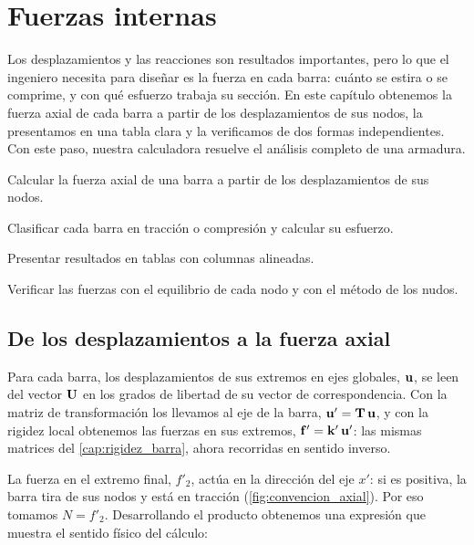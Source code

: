 \chapter{Fuerzas internas}\label{cap:fuerzas_internas}

Los desplazamientos y las reacciones son resultados importantes, pero lo que
el ingeniero necesita para diseñar es la fuerza en cada barra: cuánto se
estira o se comprime, y con qué esfuerzo trabaja su sección. En este
capítulo obtenemos la fuerza axial de cada barra a partir de los
desplazamientos de sus nodos, la presentamos en una tabla clara y la
verificamos de dos formas independientes. Con este paso, nuestra calculadora
resuelve el análisis completo de una armadura.

\begin{objetivos}
  \item Calcular la fuerza axial de una barra a partir de los
    desplazamientos de sus nodos.
  \item Clasificar cada barra en tracción o compresión y calcular su
    esfuerzo.
  \item Presentar resultados en tablas con columnas alineadas.
  \item Verificar las fuerzas con el equilibrio de cada nodo y con el método
    de los nudos.
\end{objetivos}

\section{De los desplazamientos a la fuerza axial}\label{sec:teoria_axial}

Para cada barra, los desplazamientos de sus extremos en ejes globales,
$\mathbf{u}$, se leen del vector $\mathbf{U}$ en los grados de libertad de su vector de
correspondencia. Con la matriz de transformación los llevamos al eje de la
barra, $\mathbf{u}' = \mathbf{T}\,\mathbf{u}$, y con la rigidez local obtenemos las fuerzas en sus
extremos, $\mathbf{f}' = \mathbf{k}'\,\mathbf{u}'$: las mismas matrices del
\cref{cap:rigidez_barra}, ahora recorridas en sentido inverso.

La fuerza en el extremo final, $f'_2$, actúa en la dirección del eje $x'$:
si es positiva, la barra tira de sus nodos y está en tracción
(\cref{fig:convencion_axial}). Por eso tomamos $N = f'_2$. Desarrollando el
producto obtenemos una expresión que muestra el sentido físico del cálculo:

